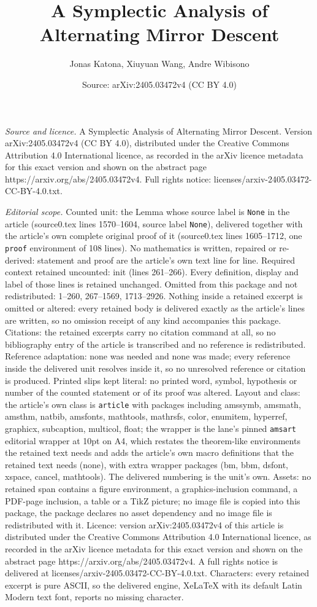 \documentclass[10pt,a4paper]{amsart}
\title[A Symplectic Analysis of Alternating Mirror Descent]{A Symplectic Analysis of Alternating Mirror Descent}
\author{Jonas Katona, Xiuyuan Wang, Andre Wibisono}
\date{Source: arXiv:2405.03472v4 (CC BY 4.0)}
\begin{document}
\maketitle

\noindent\emph{Source and licence.} A Symplectic Analysis of Alternating Mirror Descent. Version arXiv:2405.03472v4 (CC BY 4.0), distributed under the Creative Commons Attribution 4.0 International licence, as recorded in the arXiv licence metadata for this exact version and shown on the abstract page https://arxiv.org/abs/2405.03472v4. Full rights notice: licenses/arxiv-2405.03472-CC-BY-4.0.txt.\par\smallskip

\noindent\textit{Editorial scope.} Counted unit: the Lemma whose source label is \texttt{None} in the article (source0.tex lines 1570--1604, source label \texttt{None}), delivered together with the article's own complete original proof of it (source0.tex lines 1605--1712, one \texttt{proof} environment of 108 lines). No mathematics is written, repaired or re-derived: statement and proof are the article's own text line for line. Required context retained uncounted: init (lines 261--266). Every definition, display and label of those lines is retained unchanged. Omitted from this package and not redistributed: 1--260, 267--1569, 1713--2926. Nothing inside a retained excerpt is omitted or altered: every retained body is delivered exactly as the article's lines are written, so no omission receipt of any kind accompanies this package. Citations: the retained excerpts carry no citation command at all, so no bibliography entry of the article is transcribed and no reference is redistributed. Reference adaptation: none was needed and none was made; every reference inside the delivered unit resolves inside it, so no unresolved reference or citation is produced. Printed slips kept literal: no printed word, symbol, hypothesis or number of the counted statement or of its proof was altered. Layout and class: the article's own class is \texttt{article} with packages including amssymb, amsmath, amsthm, natbib, amsfonts, mathtools, mathrsfs, color, enumitem, hyperref, graphicx, subcaption, multicol, float; the wrapper is the lane's pinned \texttt{amsart} editorial wrapper at 10pt on A4, which restates the theorem-like environments the retained text needs and adds the article's own macro definitions that the retained text needs (none), with extra wrapper packages (bm, bbm, dsfont, xspace, cancel, mathtools). The delivered numbering is the unit's own. Assets: no retained span contains a figure environment, a graphics-inclusion command, a PDF-page inclusion, a table or a TikZ picture; no image file is copied into this package, the package declares no asset dependency and no image file is redistributed with it. Licence: version arXiv:2405.03472v4 of this article is distributed under the Creative Commons Attribution 4.0 International licence, as recorded in the arXiv licence metadata for this exact version and shown on the abstract page https://arxiv.org/abs/2405.03472v4. A full rights notice is delivered at licenses/arxiv-2405.03472-CC-BY-4.0.txt. Characters: every retained excerpt is pure ASCII, so the delivered engine, XeLaTeX with its default Latin Modern text font, reports no missing character.
\end{document}
